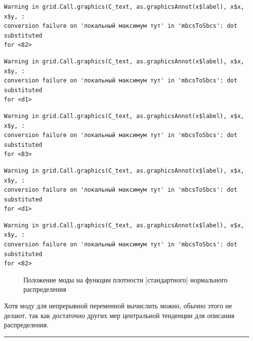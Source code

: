 \documentclass[
  letterpaper,
  DIV=11,
  numbers=noendperiod]{scrreprt}
\theoremstyle{definition}
\theoremstyle{remark}
\begin{document}
\begin{verbatim}
Warning in grid.Call.graphics(C_text, as.graphicsAnnot(x$label), x$x, x$y, :
conversion failure on 'локальный максимум тут' in 'mbcsToSbcs': dot substituted
for <82>
\end{verbatim}

\begin{verbatim}
Warning in grid.Call.graphics(C_text, as.graphicsAnnot(x$label), x$x, x$y, :
conversion failure on 'локальный максимум тут' in 'mbcsToSbcs': dot substituted
for <d1>
\end{verbatim}

\begin{verbatim}
Warning in grid.Call.graphics(C_text, as.graphicsAnnot(x$label), x$x, x$y, :
conversion failure on 'локальный максимум тут' in 'mbcsToSbcs': dot substituted
for <83>
\end{verbatim}

\begin{verbatim}
Warning in grid.Call.graphics(C_text, as.graphicsAnnot(x$label), x$x, x$y, :
conversion failure on 'локальный максимум тут' in 'mbcsToSbcs': dot substituted
for <d1>
\end{verbatim}

\begin{verbatim}
Warning in grid.Call.graphics(C_text, as.graphicsAnnot(x$label), x$x, x$y, :
conversion failure on 'локальный максимум тут' in 'mbcsToSbcs': dot substituted
for <82>
\end{verbatim}

\begin{figure}


\caption{\label{fig-continuous-mode}Положение моды на функции плотности
{[}стандартного{]} нормального распределения}

\end{figure}%

Хотя моду для непрерывной переменной вычислить можно, обычно этого не
делают, так как достаточно других мер центральной тенденции для описания
распределения.

\begin{center}\rule{0.5\linewidth}{0.5pt}\end{center}
\end{document}
